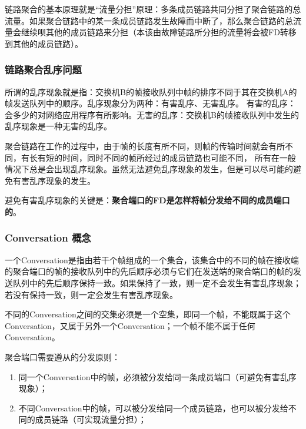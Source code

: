 \begin{remark}
    链路聚合的基本原理就是“流量分担”原理：多条成员链路共同分担了聚合链路的总流量。如果聚合链路中的某一条成员链路发生故障而中断了，那么聚合链路的总流量会继续呗其他的成员链路来分担（本该由故障链路所分担的流量将会被FD转移到其他的成员链路）。
\end{remark}

\subsubsection{链路聚合乱序问题}
所谓的乱序现象就是指：交换机B的帧接收队列中帧的排序不同于其在交换机A的帧发送队列中的顺序。乱序现象分为两种：有害乱序、无害乱序。
有害的乱序：会多少的对网络应用程序有所影响。无害的乱序：交换机B的帧接收队列中发生的乱序现象是一种无害的乱序。

聚合链路在工作的过程中，由于帧的长度有所不同，则帧的传输时间就会有所不同，有长有短的时间，同时不同的帧所经过的成员链路也可能不同，
所有在一般情况下总是会出现乱序现象。虽然无法避免乱序现象的发生，但是可以尽可能的避免有害乱序现象的发生。

避免有害乱序现象的关键是：\textbf{聚合端口的FD是怎样将帧分发给不同的成员端口的}。

\subsubsection{Conversation 概念}
一个Conversation是指由若干个帧组成的一个集合，该集合中的不同的帧在接收端的聚合端口的帧的接收队列中的先后顺序必须与它们在发送端的聚合端口的帧的发送队列中的先后顺序保持一致。如果保持了一致，则一定不会发生有害乱序现象；若没有保持一致，则一定会发生有害乱序现象。

\begin{remark}
    不同的Conversation之间的交集必须是一个空集，即同一个帧，不能既属于这个Conversation，又属于另外一个Conversation；一个帧不能不属于任何Conversation。
\end{remark}


聚合端口需要遵从的分发原则：
\begin{enumerate}
    \item 同一个Conversation中的帧，必须被分发给同一条成员端口（可避免有害乱序现象）；
    \item 不同Conversation中的帧，可以被分发给同一个成员链路，也可以被分发给不同的成员链路（可实现流量分担）；
\end{enumerate}

